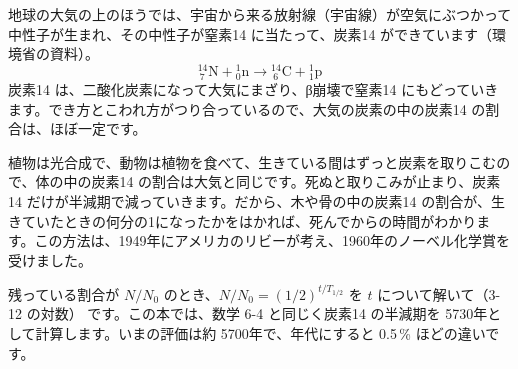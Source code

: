 \label{ph:原-12:sec7}
地球の大気の上のほうでは、宇宙から来る放射線（宇宙線）が空気にぶつかって中性子が生まれ、その中性子が窒素14 に当たって、炭素14 ができています（環境省の資料）。
\[ {}^{14}_{\ 7}\mathrm N+{}^{1}_{0}\mathrm n\longrightarrow{}^{14}_{\ 6}\mathrm C+{}^{1}_{1}\mathrm p \]
炭素14 は、二酸化炭素になって大気にまざり、β崩壊で窒素14 にもどっていきます。でき方とこわれ方がつり合っているので、大気の炭素の中の炭素14 の割合は、ほぼ一定です。

\begin{bkfigure}
\label{ph:原-12:fig-c14}
\end{bkfigure}

植物は光合成で、動物は植物を食べて、生きている間はずっと炭素を取りこむので、体の中の炭素14 の割合は大気と同じです。死ぬと取りこみが止まり、炭素14 だけが半減期で減っていきます。だから、木や骨の中の炭素14 の割合が、生きていたときの何分の1になったかをはかれば、死んでからの時間がわかります。この方法は、1949年にアメリカのリビーが考え、1960年のノーベル化学賞を受けました。

残っている割合が $N/N_0$ のとき、$N/N_0=(1/2)^{t/T_{1/2}}$ を $t$ について解いて（3-12 の対数）
\label{ph:原-12:age}です。この本では、数学 6-4 と同じく炭素14 の半減期を 5730年として計算します。いまの評価は約 5700年で、年代にすると 0.5\,\% ほどの違いです。

